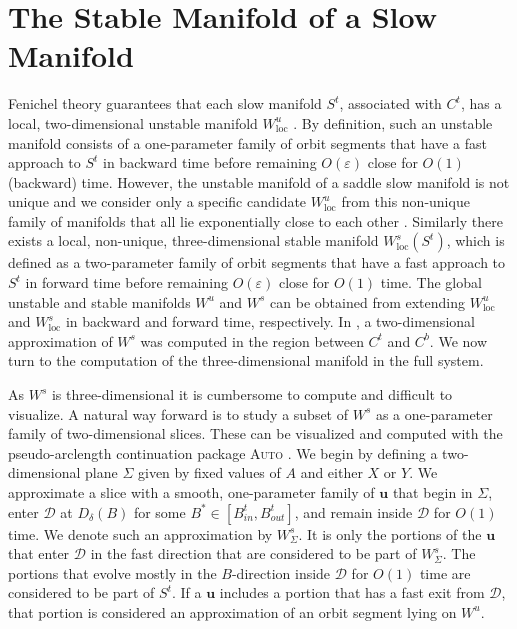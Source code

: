 \documentclass{ws-ijbc}
\begin{document}
\section{The Stable Manifold of a Slow Manifold}

Fenichel theory guarantees that each slow manifold $S^t$, associated with $C^t$, has a local, two-dimensional unstable manifold $W_{\mathrm{loc}}^u$ \cite{Fenichel}.  By definition, such an unstable manifold consists of a one-parameter family of orbit segments that have a fast approach to $S^t$ in backward time before remaining $O(\varepsilon)$ close for $O(1)$ (backward) time.  However, the unstable manifold of a saddle slow manifold is not unique and we consider only a specific candidate $W_{\mathrm{loc}}^u$ from this non-unique family of manifolds that all lie exponentially close to each other \cite{Fenichel}.  Similarly there exists a local, non-unique, three-dimensional stable manifold $W^s_{\mathrm{loc}}(S^t)$, which is defined as a two-parameter family of orbit segments that have a fast approach to $S^t$ in forward time before remaining $O(\varepsilon)$ close for $O(1)$ time.  The global unstable and stable manifolds $W^u$ and $W^s$ can be obtained from extending $W^u_{\mathrm{loc}}$ and $W^s_{\mathrm{loc}}$ in backward and forward time, respectively.  In \cite{QSSA}, a two-dimensional approximation of $W^s$ was computed in the region between $C^t$ and $C^b$.  We now turn to the computation of the three-dimensional manifold in the full system.
    
As $W^s$ is three-dimensional it is cumbersome to compute and difficult to visualize.  A natural way forward is to study a subset of $W^s$ as a one-parameter family of two-dimensional slices.  These can be visualized and computed with the pseudo-arclength continuation package \textsc{Auto} \cite{AUTO}.  We begin by defining a two-dimensional plane $\Sigma$ given by fixed values of $A$ and either $X$ or $Y$.  We approximate a slice with a smooth, one-parameter family of $\mathbf{u}$ that begin in $\Sigma$, enter $\mathscr{D}$ at $D_{\delta}(B)$ for some $B^* \in [B^t_{in}, B^t_{out}]$, and remain inside $\mathscr{D}$ for $O(1)$ time.  We denote such an approximation by $W^{s}_{\Sigma}$.  It is only the portions of the $\mathbf{u}$ that enter $\mathscr{D}$ in the fast direction that are considered to be part of $W^{s}_{\Sigma}$.  The portions that evolve mostly in the $B$-direction inside $\mathscr{D}$ for $O(1)$ time are considered to be part of $S^t$.  If a $\mathbf{u}$ includes a portion that has a fast exit from $\mathscr{D}$, that portion is considered an approximation of an orbit segment lying on $W^u$.
    
\end{document}
